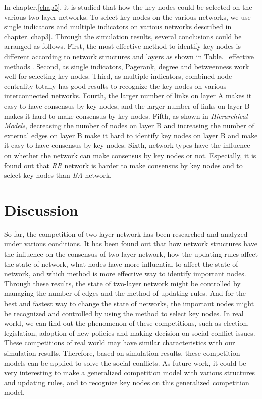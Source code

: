In chapter.\ref{chap5}, it is studied that how the key nodes could be selected on the various two-layer networks. To select key nodes on the various networks, we use single indicators and multiple indicators on various networks described in chapter.\ref{chap3}. Through the simulation results, several conclusions could be arranged as follows. First, the most effective method to identify key nodes is different according to network structures and layers as shown in Table.~\ref{effective methods}. Second, as single indicators, Pagerank, degree and betweenness work well for selecting key nodes. Third, as multiple indicators, combined node centrality totally has good results to recognize the key nodes on various interconnected networks. Fourth, the larger number of links on layer A makes it easy to have consensus by key nodes, and the larger number of links on layer B makes it hard to make consensus by key nodes. Fifth, as shown in \textit{Hierarchical Models}, decreasing the number of nodes on layer B and increasing the number of external edges on layer B make it hard to identify key nodes on layer B and make it easy to have consensus by key nodes. Sixth, network types have the influence on whether the network can make consensus by key nodes or not. Especially, it is found out that \textit{RR} network is harder to make consensus by key nodes and to select key nodes than \textit{BA} network. \\
  
\section{Discussion} 
So far, the competition of two-layer network has been researched and analyzed under various conditions. It has been found out that how network structures have the influence on the consensus of two-layer network, how the updating rules affect the state of network, what nodes have more influential to affect the state of network, and which method is more effective way to identify important nodes. Through these results, the state of two-layer network might be controlled by managing the number of edges and the method of updating rules. And for the best and fastest way to change the state of networks, the important nodes might be recognized and controlled by using the method to select key nodes.
In real world, we can find out the phenomenon of these competitions, such as election, legislation, adoption of new policies and making decision on social conflict issues. These competitions of real world may have similar characteristics with our simulation results. Therefore, based on simulation results, these competition models can be applied to solve the social conflicts. As future work, it could be very interesting to make a generalized competition model with various structures and updating rules, and to recognize key nodes on this generalized competition model.\\   
